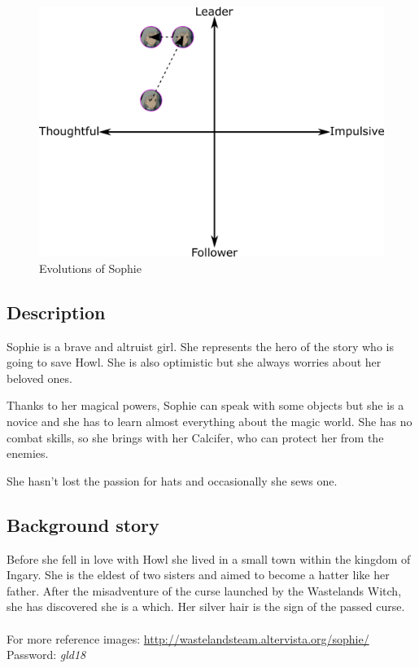 \begin{figure}[H]
  \centering
  \includegraphics[width=14cm]{Images/Diagrams/Evolutions/sophieEvolution}
  \caption{Evolutions of Sophie}
\end{figure}

\subsection{Description}
Sophie is a brave and altruist girl. She represents the hero of the story who is going to save Howl. She is also optimistic but she always worries about her beloved ones.

Thanks to her magical powers, Sophie can speak with some objects but she is a novice and she has to learn almost everything about the magic world. She has no combat skills, so she brings with her Calcifer, who can protect her from the enemies.

She hasn't lost the passion for hats and occasionally she sews one.

\subsection{Background story}
Before she fell in love with Howl she lived in a small town within the kingdom of Ingary. She is the eldest of two sisters and aimed to become a hatter like her father. After the misadventure of the curse launched by the Wastelands Witch, she has discovered she is a which. Her silver hair is the sign of the passed curse.\\\\
For more reference images: \href{http://wastelandsteam.altervista.org/sophie/}{http://wastelandsteam.altervista.org/sophie/}\\
Password: \textit{gld18}

